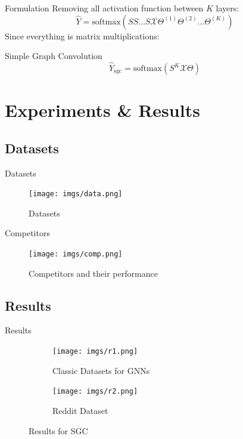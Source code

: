 \documentclass{beamer}
\begin{document}
    \begin{frame}{Formulation}
        Removing all activation function between $K$ layers:
        $$\hat{Y} = \text{softmax}(SS...S\mathcal{X}\Theta^{(1)}\Theta^{(2)}...\Theta^{(K)})$$
        Since everything is matrix multiplications:
        \begin{block}{Simple Graph Convolution}
            $$\hat{Y}_\text{sgc} = \text{softmax}(S^K\mathcal{X}\Theta)$$
        \end{block}
    \end{frame}

    \section{Experiments \& Results}

    \subsection{Datasets}

    \begin{frame}{Datasets}
        \begin{figure}
            \centering
            \texttt{[image: imgs/data.png]}
            \caption{Datasets}
            \label{fig:data}
        \end{figure}
    \end{frame}

    \begin{frame}{Competitors}
        \begin{figure}
            \centering
            \texttt{[image: imgs/comp.png]}
            \caption{Competitors and their performance}
            \label{fig:comp}
        \end{figure}
    \end{frame}

    \subsection{Results}

    \begin{frame}{Results}
    \begin{figure}
        \centering
        \begin{subfigure}{.5\textwidth}
          \centering
          \texttt{[image: imgs/r1.png]}
          \caption{Classic Datasets for GNNs}
          \label{fig:r1}
        \end{subfigure}%
        \begin{subfigure}{.5\textwidth}
          \centering
          \texttt{[image: imgs/r2.png]}
          \caption{Reddit Dataset}
          \label{fig:r2}
        \end{subfigure}
        \caption{Results for SGC}
        \label{fig:results}
    \end{figure}
\end{frame}
\end{document}
